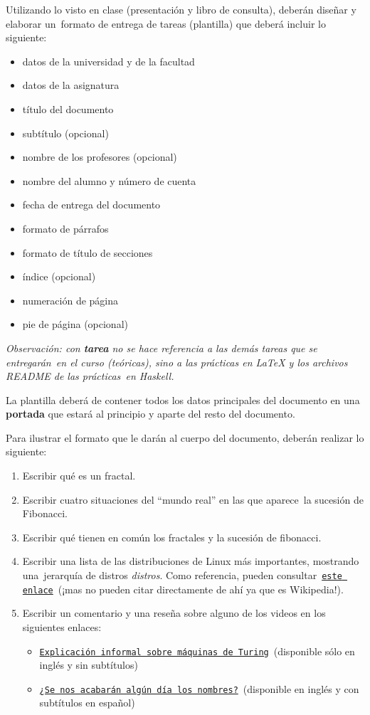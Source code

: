 \documentclass[paper=letter, fontsize=12pt]{scrartcl}
\begin{document}
\noindent
Utilizando lo visto en clase (presentación y libro de consulta), deberán diseñar y elaborar un\
formato de entrega de tareas (plantilla) que deberá incluir lo siguiente:
\begin{itemize}
\item datos de la universidad y de la facultad
\item datos de la asignatura
\item título del documento
\item subtítulo (opcional)
\item nombre de los profesores (opcional)
\item nombre del alumno y número de cuenta
\item fecha de entrega del documento
\item formato de párrafos
\item formato de título de secciones
\item índice (opcional)
\item numeración de página
\item pie de página (opcional)
\end{itemize}\par
\emph{
  Observación: con \textbf{tarea} no se hace referencia a las demás tareas que se entregarán\
  en el curso (teóricas), sino a las prácticas en \LaTeX{} y los archivos README de las prácticas\
  en Haskell.
}\par
La plantilla deberá de contener todos los datos principales del documento en una \textbf{portada}
que estará al principio y aparte del resto del documento.\par
Para ilustrar el formato que le darán al cuerpo del documento, deberán realizar lo siguiente:
\begin{enumerate}
\item Escribir qué es un fractal.
\item Escribir cuatro situaciones del ``mundo real'' en las que aparece\
  la sucesión de Fibonacci.
\item Escribir qué tienen en común los fractales y la sucesión de fibonacci.
\item Escribir una lista de las distribuciones de Linux más importantes, mostrando una\
  jerarquía de distros \textit{distros}. Como referencia, pueden consultar\
  \texttt{\href{https://en.wikipedia.org/wiki/List_of_Linux_distributions}{este enlace}}\
  (¡mas no pueden citar directamente de ahí ya que es Wikipedia!).
\item Escribir un comentario y una reseña sobre alguno de los videos en los siguientes enlaces:
  \begin{itemize}
  \item \texttt{\href{https://www.youtube.com/watch?v=dNRDvLACg5Q}{Explicación informal sobre máquinas de Turing}}\
    (disponible sólo en inglés y sin subtítulos)
  \item \texttt{\href{https://www.youtube.com/watch?v=ONs_qejnD8c}{¿Se nos acabarán algún día los nombres?}}\
    (disponible en inglés y con subtítulos en español)
  \end{itemize}
\end{enumerate}\par
\end{document}
